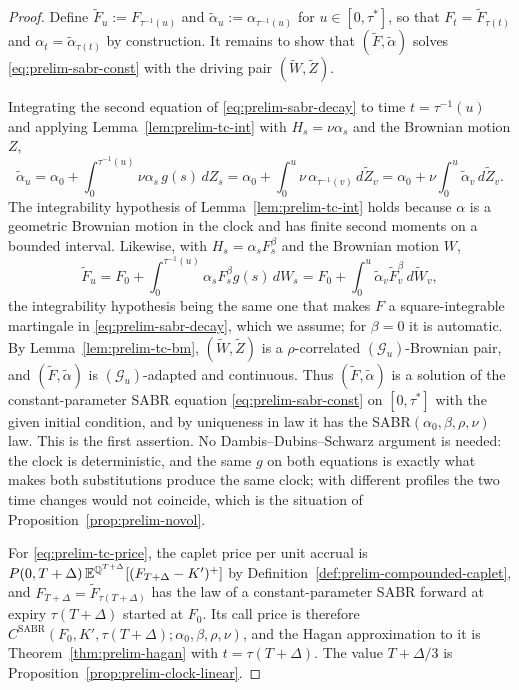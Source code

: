 \documentclass[../../../main.tex]{subfiles}
\begin{document}
\begin{proof}
Define $\tilde F_u:=F_{\tau^{-1}(u)}$ and $\tilde\alpha_u:=\alpha_{\tau^{-1}(u)}$ for $u\in[0,\tau^*]$, so that $F_t=\tilde F_{\tau(t)}$ and $\alpha_t=\tilde\alpha_{\tau(t)}$ by construction. It remains to show that $(\tilde F,\tilde\alpha)$ solves \eqref{eq:prelim-sabr-const} with the driving pair $(\tilde W,\tilde Z)$.

Integrating the second equation of \eqref{eq:prelim-sabr-decay} to time $t=\tau^{-1}(u)$ and applying Lemma~\ref{lem:prelim-tc-int} with $H_s=\nu\alpha_s$ and the Brownian motion $Z$,
\[
\tilde\alpha_u=\alpha_0+\int_0^{\tau^{-1}(u)}\nu\alpha_s\,g(s)\,dZ_s=\alpha_0+\int_0^u\nu\,\alpha_{\tau^{-1}(v)}\,d\tilde Z_v=\alpha_0+\nu\int_0^u\tilde\alpha_v\,d\tilde Z_v .
\]
The integrability hypothesis of Lemma~\ref{lem:prelim-tc-int} holds because $\alpha$ is a geometric Brownian motion in the clock and has finite second moments on a bounded interval. Likewise, with $H_s=\alpha_sF_s^{\beta}$ and the Brownian motion $W$,
\[
\tilde F_u=F_0+\int_0^{\tau^{-1}(u)}\alpha_sF_s^{\beta}g(s)\,dW_s=F_0+\int_0^u\tilde\alpha_v\tilde F_v^{\beta}\,d\tilde W_v ,
\]
the integrability hypothesis being the same one that makes $F$ a square-integrable martingale in \eqref{eq:prelim-sabr-decay}, which we assume; for $\beta=0$ it is automatic. By Lemma~\ref{lem:prelim-tc-bm}, $(\tilde W,\tilde Z)$ is a $\rho$-correlated $(\mathcal G_u)$-Brownian pair, and $(\tilde F,\tilde\alpha)$ is $(\mathcal G_u)$-adapted and continuous. Thus $(\tilde F,\tilde\alpha)$ is a solution of the constant-parameter SABR equation \eqref{eq:prelim-sabr-const} on $[0,\tau^*]$ with the given initial condition, and by uniqueness in law it has the SABR$(\alpha_0,\beta,\rho,\nu)$ law. This is the first assertion. No Dambis--Dubins--Schwarz argument is needed: the clock is deterministic, and the same $g$ on both equations is exactly what makes both substitutions produce the same clock; with different profiles the two time changes would not coincide, which is the situation of Proposition~\ref{prop:prelim-novol}.

For \eqref{eq:prelim-tc-price}, the caplet price per unit accrual is $P(0,T+\Delta)\,\mathbb{E}^{\mathbb{Q}^{T+\Delta}}[(F_{T+\Delta}-K')^+]$ by Definition~\ref{def:prelim-compounded-caplet}, and $F_{T+\Delta}=\tilde F_{\tau(T+\Delta)}$ has the law of a constant-parameter SABR forward at expiry $\tau(T+\Delta)$ started at $F_0$. Its call price is therefore $C^{\mathrm{SABR}}(F_0,K',\tau(T+\Delta);\alpha_0,\beta,\rho,\nu)$, and the Hagan approximation to it is Theorem~\ref{thm:prelim-hagan} with $t=\tau(T+\Delta)$. The value $T+\Delta/3$ is Proposition~\ref{prop:prelim-clock-linear}.
\end{proof}
\end{document}

